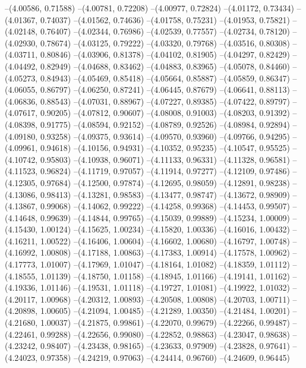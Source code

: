 --(4.00586, 0.71588)
--(4.00781, 0.72208)
--(4.00977, 0.72824)
--(4.01172, 0.73434)
--(4.01367, 0.74037)
--(4.01562, 0.74636)
--(4.01758, 0.75231)
--(4.01953, 0.75821)
--(4.02148, 0.76407)
--(4.02344, 0.76986)
--(4.02539, 0.77557)
--(4.02734, 0.78120)
--(4.02930, 0.78674)
--(4.03125, 0.79222)
--(4.03320, 0.79768)
--(4.03516, 0.80308)
--(4.03711, 0.80846)
--(4.03906, 0.81378)
--(4.04102, 0.81905)
--(4.04297, 0.82429)
--(4.04492, 0.82949)
--(4.04688, 0.83462)
--(4.04883, 0.83965)
--(4.05078, 0.84460)
--(4.05273, 0.84943)
--(4.05469, 0.85418)
--(4.05664, 0.85887)
--(4.05859, 0.86347)
--(4.06055, 0.86797)
--(4.06250, 0.87241)
--(4.06445, 0.87679)
--(4.06641, 0.88113)
--(4.06836, 0.88543)
--(4.07031, 0.88967)
--(4.07227, 0.89385)
--(4.07422, 0.89797)
--(4.07617, 0.90205)
--(4.07812, 0.90607)
--(4.08008, 0.91003)
--(4.08203, 0.91392)
--(4.08398, 0.91775)
--(4.08594, 0.92152)
--(4.08789, 0.92526)
--(4.08984, 0.92894)
--(4.09180, 0.93258)
--(4.09375, 0.93614)
--(4.09570, 0.93960)
--(4.09766, 0.94295)
--(4.09961, 0.94618)
--(4.10156, 0.94931)
--(4.10352, 0.95235)
--(4.10547, 0.95525)
--(4.10742, 0.95803)
--(4.10938, 0.96071)
--(4.11133, 0.96331)
--(4.11328, 0.96581)
--(4.11523, 0.96824)
--(4.11719, 0.97057)
--(4.11914, 0.97277)
--(4.12109, 0.97486)
--(4.12305, 0.97684)
--(4.12500, 0.97874)
--(4.12695, 0.98059)
--(4.12891, 0.98238)
--(4.13086, 0.98413)
--(4.13281, 0.98583)
--(4.13477, 0.98747)
--(4.13672, 0.98909)
--(4.13867, 0.99068)
--(4.14062, 0.99222)
--(4.14258, 0.99368)
--(4.14453, 0.99507)
--(4.14648, 0.99639)
--(4.14844, 0.99765)
--(4.15039, 0.99889)
--(4.15234, 1.00009)
--(4.15430, 1.00124)
--(4.15625, 1.00234)
--(4.15820, 1.00336)
--(4.16016, 1.00432)
--(4.16211, 1.00522)
--(4.16406, 1.00604)
--(4.16602, 1.00680)
--(4.16797, 1.00748)
--(4.16992, 1.00808)
--(4.17188, 1.00863)
--(4.17383, 1.00914)
--(4.17578, 1.00962)
--(4.17773, 1.01007)
--(4.17969, 1.01047)
--(4.18164, 1.01082)
--(4.18359, 1.01112)
--(4.18555, 1.01139)
--(4.18750, 1.01158)
--(4.18945, 1.01166)
--(4.19141, 1.01162)
--(4.19336, 1.01146)
--(4.19531, 1.01118)
--(4.19727, 1.01081)
--(4.19922, 1.01032)
--(4.20117, 1.00968)
--(4.20312, 1.00893)
--(4.20508, 1.00808)
--(4.20703, 1.00711)
--(4.20898, 1.00605)
--(4.21094, 1.00485)
--(4.21289, 1.00350)
--(4.21484, 1.00201)
--(4.21680, 1.00037)
--(4.21875, 0.99861)
--(4.22070, 0.99679)
--(4.22266, 0.99487)
--(4.22461, 0.99288)
--(4.22656, 0.99080)
--(4.22852, 0.98863)
--(4.23047, 0.98638)
--(4.23242, 0.98407)
--(4.23438, 0.98165)
--(4.23633, 0.97909)
--(4.23828, 0.97641)
--(4.24023, 0.97358)
--(4.24219, 0.97063)
--(4.24414, 0.96760)
--(4.24609, 0.96445)
